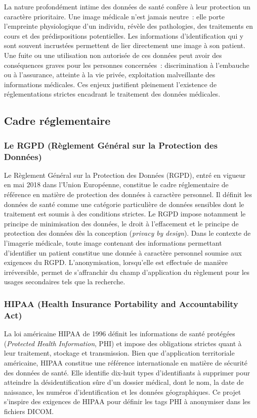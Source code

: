 La nature profondément intime des données de santé confère à leur protection un caractère prioritaire. Une image médicale n'est jamais neutre~: elle porte l'empreinte physiologique d'un individu, révèle des pathologies, des traitements en cours et des prédispositions potentielles. Les informations d'identification qui y sont souvent incrustées permettent de lier directement une image à son patient. Une fuite ou une utilisation non autorisée de ces données peut avoir des conséquences graves pour les personnes concernées~: discrimination à l'embauche ou à l'assurance, atteinte à la vie privée, exploitation malveillante des informations médicales. Ces enjeux justifient pleinement l'existence de réglementations strictes encadrant le traitement des données médicales.

\subsection{Cadre réglementaire}

\subsubsection{Le RGPD (Règlement Général sur la Protection des Données)}

Le Règlement Général sur la Protection des Données (RGPD), entré en vigueur en mai 2018 dans l'Union Européenne, constitue le cadre réglementaire de référence en matière de protection des données à caractère personnel. Il définit les données de santé comme une catégorie particulière de données sensibles dont le traitement est soumis à des conditions strictes. Le RGPD impose notamment le principe de minimisation des données, le droit à l'effacement et le principe de protection des données dès la conception (\textit{privacy by design}). Dans le contexte de l'imagerie médicale, toute image contenant des informations permettant d'identifier un patient constitue une donnée à caractère personnel soumise aux exigences du RGPD. L'anonymisation, lorsqu'elle est effectuée de manière irréversible, permet de s'affranchir du champ d'application du règlement pour les usages secondaires tels que la recherche.

\subsubsection{HIPAA (Health Insurance Portability and Accountability Act)}

La loi américaine HIPAA de 1996 définit les informations de santé protégées (\textit{Protected Health Information}, PHI) et impose des obligations strictes quant à leur traitement, stockage et transmission. Bien que d'application territoriale américaine, HIPAA constitue une référence internationale en matière de sécurité des données de santé. Elle identifie dix-huit types d'identifiants à supprimer pour atteindre la désidentification sûre d'un dossier médical, dont le nom, la date de naissance, les numéros d'identification et les données géographiques. Ce projet s'inspire des exigences de HIPAA pour définir les tags PHI à anonymiser dans les fichiers DICOM.

